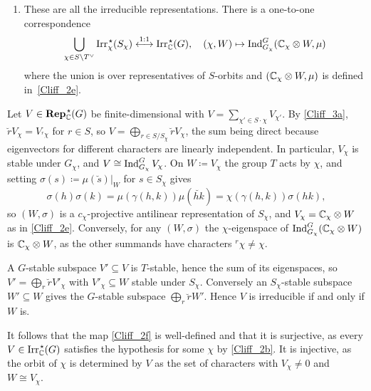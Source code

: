 \begin{enumerate}[resume, label=\textnormal{(\Roman*)}]  
\item
  These are all the irreducible representations.
  There is a one-to-one correspondence
\begin{equation} \label{Cliff_2f}
  \bigcup_{\chi \in S \backslash T^{\vee}}  {\operatorname{Irr}_{\chi}^{\hspace{0.1em} \star}(S_\chi)} \stackrel{1:1}{\longleftrightarrow}
{\operatorname{Irr}_{{\mathbb C}}^{\hspace{0.1em} \star}(G)}, \quad
(\chi, W) \mapsto \operatorname{Ind}_{G_\chi}^G ({\mathbb C}_\chi \otimes W , \mu)  
\end{equation}
where the union is over representatives of $S$-orbits and $({\mathbb C}_\chi \otimes W, \mu)$  is defined in~\eqref{Cliff_2e}. 
    \end{enumerate}

\begin{just}
Let $V \in \operatorname{\mathbf{Rep}}_{{\mathbb C}}^{\hspace{0.1em} \star}(G)$ be finite-dimensional with $V = \sum_{\chi' \in S \cdot \chi} V_{\chi'}$. By \eqref{Cliff_3a}, $\breve{r} V_{\chi} = V_{{}^{r}\chi}$ for $r \in S$, so $V = \bigoplus_{r \in S/S_{\chi}} \breve{r} V_{\chi}$, the sum being direct because eigenvectors for different characters are linearly independent. In particular, $V_{\chi}$ is stable under $G_{\chi}$, and $V \cong \operatorname{Ind}_{G_{\chi}}^{G} V_{\chi}$. On $W \coloneqq V_{\chi}$ the group $T$ acts by $\chi$, and setting $\sigma(s) \coloneqq \mu(\breve{s})|_{W}$ for $s \in S_{\chi}$ gives
\[
\sigma(h)\sigma(k) = \mu(\gamma(h,k)) \mu(\breve{hk}) = \chi(\gamma(h,k)) \sigma(hk),
\]
so $(W, \sigma)$ is a $c_{\chi}$-projective antilinear representation of $S_{\chi}$, and $V_{\chi} = {\mathbb C}_{\chi} \otimes W$ as in \eqref{Cliff_2e}. Conversely, for any $(W, \sigma)$ the $\chi$-eigenspace of $\operatorname{Ind}_{G_{\chi}}^{G}({\mathbb C}_{\chi} \otimes W)$ is ${\mathbb C}_{\chi} \otimes W$, as the other summands have characters ${}^{r}\chi \neq \chi$.

A $G$-stable subspace $V' \subseteq V$ is $T$-stable, hence the sum of its eigenspaces, so $V' = \bigoplus_{r} \breve{r} V'_{\chi}$ with $V'_{\chi} \subseteq W$ stable under $S_{\chi}$. Conversely an $S_{\chi}$-stable subspace $W' \subseteq W$ gives the $G$-stable subspace $\bigoplus_{r} \breve{r} W'$. Hence $V$ is irreducible if and only if $W$ is.

It follows that the map \eqref{Cliff_2f} is well-defined and that it is surjective, as every $V \in \operatorname{Irr}_{{\mathbb C}}^{\hspace{0.1em} \star}(G)$ satisfies the hypothesis for some $\chi$ by \eqref{Cliff_2b}. It is injective, as the orbit of $\chi$ is determined by $V$ as the set of characters with $V_{\chi} \neq 0$ and $W \cong V_{\chi}$.
\end{just}
  
